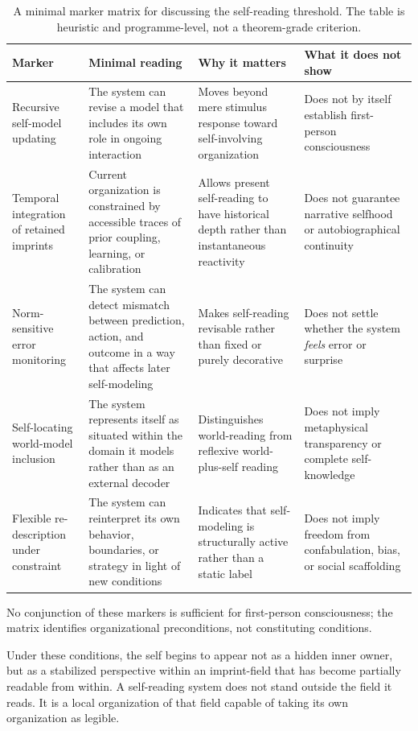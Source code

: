 \documentclass[12pt,a4paper]{article}
\begin{document}
\begin{table}[ht]
\centering
\small
\begin{tabular}{@{}P{3.4cm}P{3.5cm}P{3.7cm}P{4.0cm}@{}}
\toprule
\textbf{Marker} & \textbf{Minimal reading} & \textbf{Why it matters} & \textbf{What it does not show} \\
\midrule
Recursive self-model updating & The system can revise a model that includes its own role in ongoing interaction & Moves beyond mere stimulus response toward self-involving organization & Does not by itself establish first-person consciousness \\
\addlinespace
Temporal integration of retained imprints & Current organization is constrained by accessible traces of prior coupling, learning, or calibration & Allows present self-reading to have historical depth rather than instantaneous reactivity & Does not guarantee narrative selfhood or autobiographical continuity \\
\addlinespace
Norm-sensitive error monitoring & The system can detect mismatch between prediction, action, and outcome in a way that affects later self-modeling & Makes self-reading revisable rather than fixed or purely decorative & Does not settle whether the system \emph{feels} error or surprise \\
\addlinespace
Self-locating world-model inclusion & The system represents itself as situated within the domain it models rather than as an external decoder & Distinguishes world-reading from reflexive world-plus-self reading & Does not imply metaphysical transparency or complete self-knowledge \\
\addlinespace
Flexible re-description under constraint & The system can reinterpret its own behavior, boundaries, or strategy in light of new conditions & Indicates that self-modeling is structurally active rather than a static label & Does not imply freedom from confabulation, bias, or social scaffolding \\
\bottomrule
\end{tabular}
\caption{A minimal marker matrix for discussing the self-reading threshold. The table is heuristic and programme-level, not a theorem-grade criterion.}
\label{tab:threshold}
\end{table}

No conjunction of these markers is sufficient for first-person consciousness; the matrix identifies organizational preconditions, not constituting conditions.

Under these conditions, the self begins to appear not as a hidden inner owner, but as a stabilized perspective within an imprint-field that has become partially readable from within. A self-reading system does not stand outside the field it reads. It is a local organization of that field capable of taking its own organization as legible.
\end{document}
